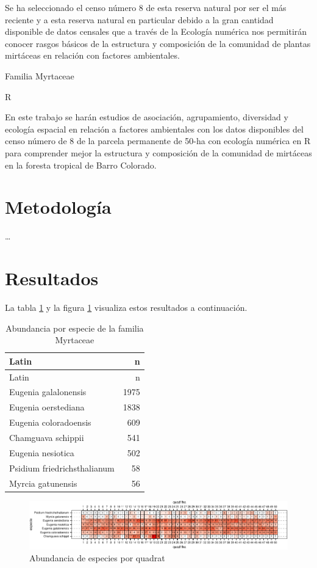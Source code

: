 \documentclass[11pt,]{article}
\begin{document}
Se ha seleccionado el censo número 8 de esta reserva natural por ser el
más reciente y a esta reserva natural en particular debido a la gran
cantidad disponible de datos censales que a través de la Ecología
numérica nos permitirán conocer rasgos básicos de la estructura y
composición de la comunidad de plantas mirtáceas en relación con
factores ambientales.

Familia Myrtaceae

R

En este trabajo se harán estudios de asociación, agrupamiento,
diversidad y ecología espacial en relación a factores ambientales con
los datos disponibles del censo número de 8 de la parcela permanente de
50-ha con ecología numérica en R para comprender mejor la estructura y
composición de la comunidad de mirtáceas en la foresta tropical de Barro
Colorado.

\section{Metodología}\label{metodologuxeda}

\ldots

\section{Resultados}\label{resultados}

La tabla \ref{tab:abun_sp} y la figura \ref{fig:abun_sp_q} visualiza
estos resultados a continuación.

\begin{longtable}[]{@{}lr@{}}
\caption{\label{tab:abun_sp}Abundancia por especie de la familia
Myrtaceae}\tabularnewline
\toprule
Latin & n\tabularnewline
\midrule
\endfirsthead
\toprule
Latin & n\tabularnewline
\midrule
\endhead
Eugenia galalonensis & 1975\tabularnewline
Eugenia oerstediana & 1838\tabularnewline
Eugenia coloradoensis & 609\tabularnewline
Chamguava schippii & 541\tabularnewline
Eugenia nesiotica & 502\tabularnewline
Psidium friedrichsthalianum & 58\tabularnewline
Myrcia gatunensis & 56\tabularnewline
\bottomrule
\end{longtable}

\begin{figure}
\centering
\includegraphics{manuscrito_files/figure-latex/unnamed-chunk-3-1.pdf}
\caption{\label{fig:abun_sp_q}Abundancia de especies por quadrat}
\end{figure}
\end{document}
